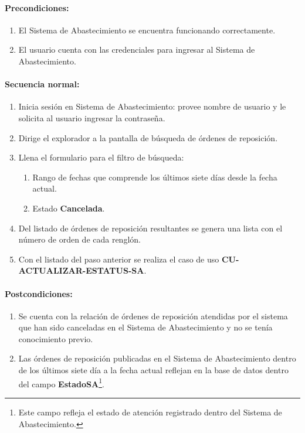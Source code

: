 \paragraph{Precondiciones:}
\begin{enumerate}
  \item El Sistema de Abastecimiento se encuentra funcionando correctamente.
  \item El usuario cuenta con las credenciales para ingresar al Sistema de Abastecimiento.
\end{enumerate}
\paragraph{Secuencia normal:}
\begin{enumerate}
  \item Inicia sesión en Sistema de Abastecimiento: provee nombre de usuario y le solicita al usuario ingresar la contraseña.
  \item Dirige el explorador a la pantalla de búsqueda de órdenes de reposición.
  \item Llena el formulario para el filtro de búsqueda:
  \begin{enumerate}
    \item Rango de fechas que comprende los últimos siete días desde la fecha actual.
    \item Estado \textbf{Cancelada}.
  \end{enumerate}
  \item Del listado de órdenes de reposición resultantes se genera una lista con el número de orden de cada renglón.
  \item Con el listado del paso anterior se realiza el caso de uso \textbf{CU-ACTUALIZAR-ESTATUS-SA}.
\end{enumerate}
\paragraph{Postcondiciones:}
\begin{enumerate}
  \item Se cuenta con la relación de órdenes de reposición atendidas por el sistema que han sido canceladas en el Sistema de Abastecimiento y no se tenía conocimiento previo.
  \item Las órdenes de reposición publicadas en el Sistema de Abastecimiento dentro de los últimos siete día a la fecha actual reflejan en la base de datos dentro del campo \textbf{EstadoSA}\footnote{Este campo refleja el estado de atención registrado dentro del Sistema de Abastecimiento.}.
\end{enumerate}
